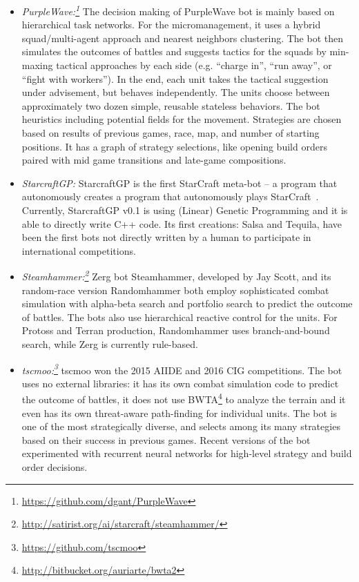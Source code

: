 \begin{itemize}
  \item {\em PurpleWave:\footnote{\url{https://github.com/dgant/PurpleWave}}} The decision making of PurpleWave bot is mainly based on hierarchical task networks. For the micromanagement, it uses a hybrid squad/multi-agent approach and nearest neighbors clustering. The bot then simulates the outcomes of battles and suggests tactics for the squads by min-maxing tactical approaches by each side (e.g. ``charge in'', ``run away'', or ``fight with workers''). In the end, each unit takes the tactical suggestion under advisement, but behaves independently. The units choose between approximately two dozen simple, reusable stateless behaviors. The bot heuristics including potential fields for the movement. Strategies are chosen based on results of previous games, race, map, and number of starting positions. It has a graph of strategy selections, like opening build orders paired with mid game transitions and late-game compositions.
  
	\newpage
	
  \item {\em StarcraftGP:} StarcraftGP is the first StarCraft meta-bot -- a program that autonomously creates a program that autonomously plays StarCraft~\cite{garcia2015towards}. Currently, StarcraftGP v0.1 is using (Linear) Genetic Programming and it is able to directly write C++ code. Its first creations: Salsa and Tequila, have been the first bots not directly written by a human to participate in international competitions.

  \item {\em Steamhammer:\footnote{\url{http://satirist.org/ai/starcraft/steamhammer/}}} Zerg bot Steamhammer, developed by Jay Scott, and its random-race version Randomhammer both employ sophisticated combat simulation with alpha-beta search and portfolio search to predict the outcome of battles. The bots also use hierarchical reactive control for the units. For Protoss and Terran production, Randomhammer uses branch-and-bound search, while Zerg is currently rule-based.

  \item {\em tscmoo:\footnote{\url{https://github.com/tscmoo}}} tscmoo won the 2015 AIIDE and 2016 CIG competitions. The bot uses no external libraries: it has its own combat simulation code to predict the outcome of battles, it does not use BWTA\footnote{\url{http://bitbucket.org/auriarte/bwta2}} to analyze the terrain and it even has its own threat-aware path-finding for individual units. The bot is one of the most strategically diverse, and selects among its many strategies based on their success in previous games. Recent versions of the bot experimented with recurrent neural networks for high-level strategy and build order decisions.


\end{itemize}
